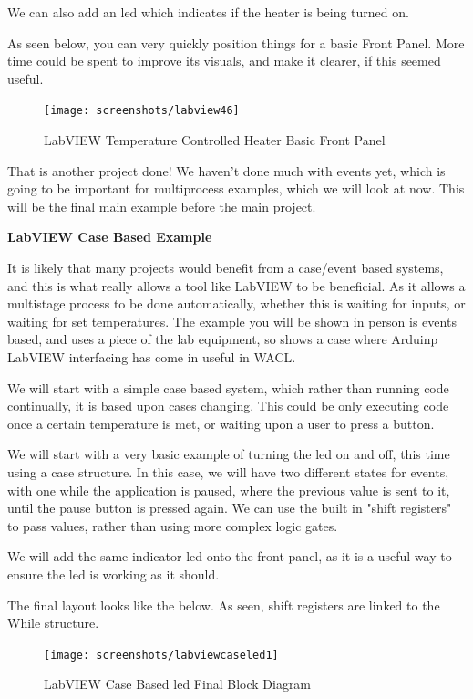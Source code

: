 \documentclass[a4paper,11pt]{report}
\begin{document}
We can also add an \gls{led} which indicates if the heater is being turned on.

As seen below, you can very quickly position things for a basic Front Panel. More time could be spent to improve its visuals, and make it clearer, if this seemed useful.

\begin{figure}[H]
\centering
\texttt{[image: screenshots/labview46]}
\caption{LabVIEW Temperature Controlled Heater Basic Front Panel}
\end{figure}

That is another project done! We haven't done much with events yet, which is going to be important for multiprocess examples, which we will look at now. This will be the final main example before the main project.

\textbf{LabVIEW Case Based Example}

It is likely that many projects would benefit from a case/event based systems, and this is what really allows a tool like LabVIEW to be beneficial. As it allows a multistage process to be done automatically, whether this is waiting for inputs, or waiting for set temperatures. The example you will be shown in person is events based, and uses a piece of the lab equipment, so shows a case where Arduinp LabVIEW interfacing has come in useful in WACL.

We will start with a simple case based system, which rather than running code continually, it is based upon cases changing. This could be only executing code once a certain temperature is met, or waiting upon a user to press a button.

We will start with a very basic example of turning the \gls{led} on and off, this time using a case structure. In this case, we will have two different states for events, with one while the application is paused, where the previous value is sent to it, until the pause button is pressed again. We can use the built in "shift registers" to pass values, rather than using more complex logic gates.

We will add the same indicator \gls{led} onto the front panel, as it is a useful way to ensure the \gls{led} is working as it should.

The final layout looks like the below. As seen, shift registers are linked to the While structure.

\begin{figure}[H]
\centering
\texttt{[image: screenshots/labviewcaseled1]}
\caption{LabVIEW Case Based \gls{led} Final Block Diagram}
\end{figure}
\end{document}
